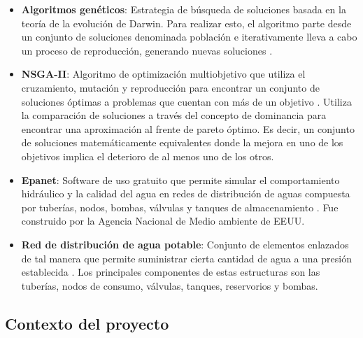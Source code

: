 \documentclass[11pt,letterpaper]{article}
\begin{document}
\begin{itemize}
\item \textbf{Algoritmos genéticos}: Estrategia de búsqueda de soluciones basada en la teoría de la evolución de Darwin. Para realizar esto, el algoritmo parte desde un conjunto de soluciones denominada población e iterativamente lleva a cabo un proceso de reproducción, generando nuevas soluciones \cite{Heiss-Czedik1997}.

\item \textbf{NSGA-II}: Algoritmo de optimización multiobjetivo que utiliza el cruzamiento, mutación y reproducción para encontrar un conjunto de soluciones óptimas a problemas que cuentan con más de un objetivo \cite{Deb2002}. Utiliza la comparación de soluciones a través del concepto de dominancia para encontrar una aproximación al frente de pareto óptimo. Es decir, un conjunto de soluciones matemáticamente equivalentes donde la mejora en uno de los objetivos implica el deterioro de al menos uno de los otros.

\item \textbf{Epanet}: Software de uso gratuito que permite simular el comportamiento hidráulico y la calidad del agua en redes de distribución de aguas compuesta por tuberías, nodos, bombas, válvulas y tanques de almacenamiento \cite{Rossman2017}. Fue construido por la Agencia Nacional de Medio ambiente de EEUU.
\item \textbf{Red de distribución de agua potable}: Conjunto de elementos enlazados de tal manera que permite suministrar cierta cantidad de agua a una presión establecida \cite{Doctoral2012}. Los principales componentes de estas estructuras son las tuberías, nodos de consumo, válvulas, tanques, reservorios y bombas.  
 
\end{itemize}

\subsection{Contexto del proyecto} 
\end{document}
